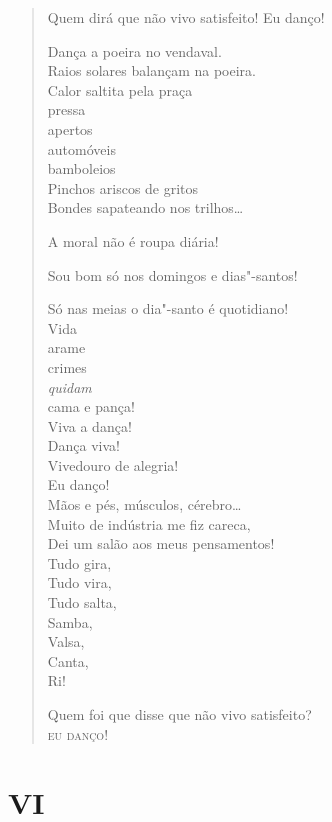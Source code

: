 \begin{verse}
Quem dirá que não vivo satisfeito! Eu danço!

Dança a poeira no vendaval.\\
Raios solares balançam na poeira.\\
Calor saltita pela praça\\
\quad\quad\quad{}pressa\\
\quad\quad\quad{}apertos\\
\quad\quad\quad{}automóveis\\
\quad\quad{}bamboleios\\
\quad{}Pinchos ariscos de gritos\\
Bondes sapateando nos trilhos\ldots{}

A moral não é roupa diária!

Sou bom só nos domingos e dias"-santos!

Só nas meias o dia"-santo é quotidiano!\\
\quad\quad\quad{}Vida\\
\quad\quad\quad{}arame\\
\quad\quad\quad{}crimes\\
\quad\quad\quad{}\emph{quidam}\\
\quad\quad\quad{}cama e pança!\\
\quad\quad{}Viva a dança!\\
\quad\quad{}Dança viva!\\
\quad{}Vivedouro de alegria!\\
Eu danço!\\
Mãos e pés, músculos, cérebro\ldots{}\\
\quad{}Muito de indústria me fiz careca,\\
\quad{}Dei um salão aos meus pensamentos!\\
\quad\quad\quad{}Tudo gira,\\
\quad\quad\quad{}Tudo vira,\\
\quad\quad\quad{}Tudo salta,\\
\quad\quad\quad{}Samba,\\
\quad\quad\quad{}Valsa,\\
\quad\quad\quad{}Canta,\\
\quad\quad\quad{}Ri!

Quem foi que disse que não vivo satisfeito?\\
\textsc{eu danço}!
\end{verse}

\pagebreak
\section*{VI}

